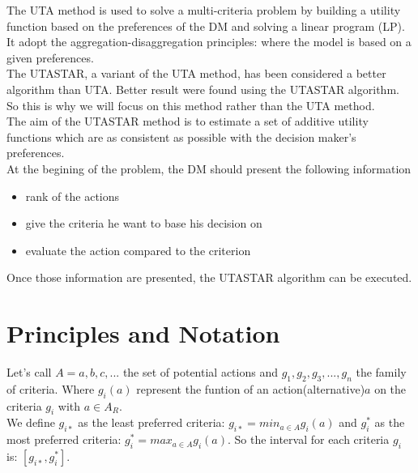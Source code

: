\documentclass{report}
\begin{document}
The UTA method is used to solve a multi-criteria problem by building a utility function based on the preferences of the DM and solving a linear program (LP). It adopt the aggregation-disaggregation principles: where the model is based on a given preferences.\\

The UTASTAR, a variant of the UTA method, has been considered a better algorithm than UTA. Better result were found using the UTASTAR algorithm. So this is why we will focus on this method rather than the UTA method.\\

The aim of the UTASTAR method is to estimate a set of additive utility functions which are as consistent as possible with the decision maker's preferences.\\

At the begining of the problem, the DM should present the following information 
\begin{itemize}
\item rank of the actions
\item give the criteria he want to base his decision on 
\item evaluate the action compared to the criterion
\end{itemize}
Once those information are presented, the UTASTAR algorithm can be executed. 

\newpage
\section{Principles and Notation}
Let's call $A={a,b,c,...}$ the set of potential actions and $g_1, g_2, g_3, ..., g_n$ the family of criteria. Where $g_i(a)$ represent the funtion of an action(alternative)$a$ on the criteria $g_i$ with $a \in A_R$. \\

We define $g_{i*}$ as the least preferred criteria: $g_{i*} = min_{a \in A} g_i (a)$ and $g_i^{*}$ as the most preferred criteria: $g_i^{*} = max_{a \in A} g_i (a)$. So the interval for each criteria $g_i$ is: $[g_{i*} , g_i^{*}]$.\\
\end{document}
